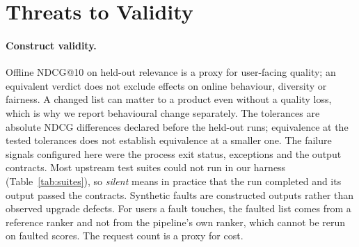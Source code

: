 \documentclass[11pt,a4paper]{article}
\begin{document}
\section{Threats to Validity}
\label{sec:threats}

\paragraph{Construct validity.} Offline NDCG@10 on held-out relevance is a
proxy for user-facing quality; an equivalent verdict does not exclude effects
on online behaviour, diversity or fairness. A changed list can matter to a
product even without a quality loss, which is why we report behavioural change
separately. The tolerances are absolute NDCG differences declared before the
held-out runs; equivalence at the tested tolerances does not establish
equivalence at a smaller one. The failure signals configured here were the
process exit status, exceptions and the output contracts. Most upstream test
suites could not run in our harness (Table~\ref{tab:suites}), so
\emph{silent} means in practice that the run completed and its output passed
the contracts. Synthetic faults are constructed outputs rather
than observed upgrade defects. For users a fault touches, the faulted list
comes from a reference ranker and not from the pipeline's own ranker, which
cannot be rerun on faulted scores. The request count is a proxy for cost.
\end{document}
